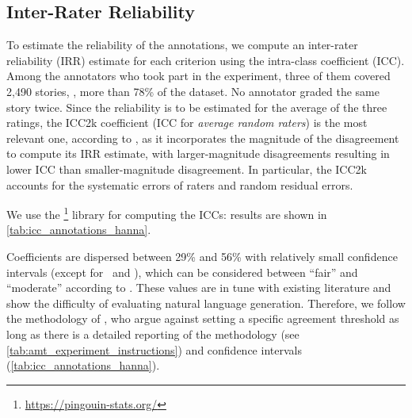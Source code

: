 \subsection{Inter-Rater Reliability}
\label{sub:inter_rater_reliability_hanna}

To estimate the reliability of the annotations, we compute an inter-rater reliability (IRR) estimate for each criterion using the intra-class coefficient (ICC). Among the annotators who took part in the experiment, three of them covered 2,490 stories, \ie, more than 78\% of the dataset. No annotator graded the same story twice. Since the reliability is to be estimated for the average of the three ratings, the ICC2k coefficient (ICC for \emph{average random raters}) is the most relevant one, according to \citet{hallgren2012computing}, as it incorporates the magnitude of the disagreement to compute its IRR estimate, with larger-magnitude disagreements resulting in lower ICC than smaller-magnitude disagreement. In particular, the ICC2k accounts for the systematic errors of raters and random residual errors.

We use the \pingouin\footnote{\url{https://pingouin-stats.org/}} library \citep{vallat2018pingouin} for computing the ICCs: results are shown in \autoref{tab:icc_annotations_hanna}.

Coefficients are dispersed between 29\% and 56\% with relatively small confidence intervals (except for \myre\ and \mych), which can be considered between ``fair'' and ``moderate'' according to \citet{landis1977measurement}. These values are in tune with existing literature \citep{spooren2010coding, ritter2011data, graham2017can, habernal2017argumentation, karpinska2021perils} and show the difficulty of evaluating natural language generation. Therefore, we follow the methodology of \citet{craggs2005evaluating, artstein2008inter}, who argue against setting a specific agreement threshold as long as there is a detailed reporting of the methodology (see \autoref{tab:amt_experiment_instructions}) and confidence intervals (\autoref{tab:icc_annotations_hanna}).

